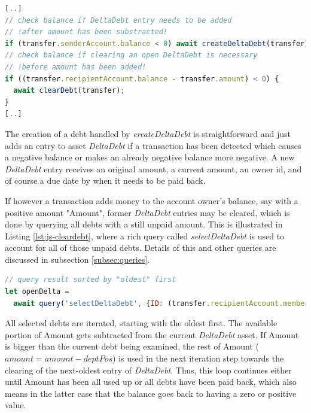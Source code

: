 \begin{center}
\begin{minipage}{0.8\textwidth}
\small
\begin{lstlisting}[language=javascript,firstnumber=1,caption={\bf\small moveMoney JavaScript excerpt}, captionpos=b,label=lst:js-movemoney]
[..]
// check balance if DeltaDebt entry needs to be added
// !after amount has been substracted!
if (transfer.senderAccount.balance < 0) await createDeltaDebt(transfer);
// check balance if clearing an open DeltaDebt is necessary
// !before amount has been added!
if ((transfer.recipientAccount.balance - transfer.amount) < 0) {
  await clearDebt(transfer);
}
[..]
\end{lstlisting}
\end{minipage}
\end{center}

The creation of a debt handled by \textit{createDeltaDebt} is straightforward and just adds an entry to asset \textit{DeltaDebt} if a transaction has been detected which causes a negative balance or makes an already negative balance more negative. A new \textit{DeltaDebt} entry receives an original amount, a current amount, an owner id, and of course a due date by when it needs to be paid back.

If however a transaction adds money to the account owner's balance, say with a positive amount "Amount", former \textit{DeltaDebt} entries may be cleared, which is done by querying all debts with a still unpaid amount. This is illustrated in Listing \ref{lst:js-cleardebt}, where a rich query called \textit{selectDeltaDebt} is used to account for all of those unpaid debts. Details of this and other queries are discussed in subsection \ref{subsec:queries}.

\begin{center}
\begin{minipage}{0.8\textwidth}
\small
\begin{lstlisting}[language=javascript,firstnumber=1,caption={\bf\small clearDebt JavaScript excerpt}, captionpos=b,label=lst:js-cleardebt]
// query result sorted by "oldest" first
let openDelta =
  await query('selectDeltaDebt', {ID: (transfer.recipientAccount.member.memberID)});
\end{lstlisting}
\end{minipage}
\end{center}

All selected debts are iterated, starting with the oldest first. The available portion of Amount gets subtracted from the current \textit{DeltaDebt} asset. If Amount is bigger than the current debt being examined, the rest of Amount ($amount = amount - deptPos$) is used in the next iteration step towards the clearing of the next-oldest entry of \textit{DeltaDebt}. Thus, this loop continues either until Amount has been all used up or all debts have been paid back, which also means in the latter case that the balance goes back to having a zero or positive value.

